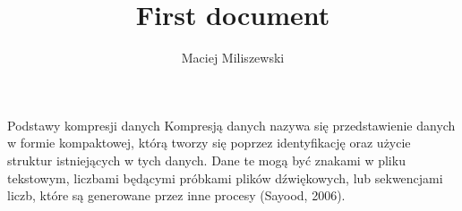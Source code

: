 \documentclass[12pt, letterpaper]{article}
\title{First document}
\author{Maciej Miliszewski}
\begin{document}
\maketitle

Podstawy kompresji danych
Kompresją danych nazywa się przedstawienie danych w formie kompaktowej, którą tworzy się poprzez identyfikację oraz użycie struktur istniejących w tych danych.
Dane te mogą być znakami w pliku tekstowym, liczbami będącymi próbkami plików dźwiękowych, lub sekwencjami liczb, które są generowane przez inne procesy (Sayood, 2006).
\end{document}
